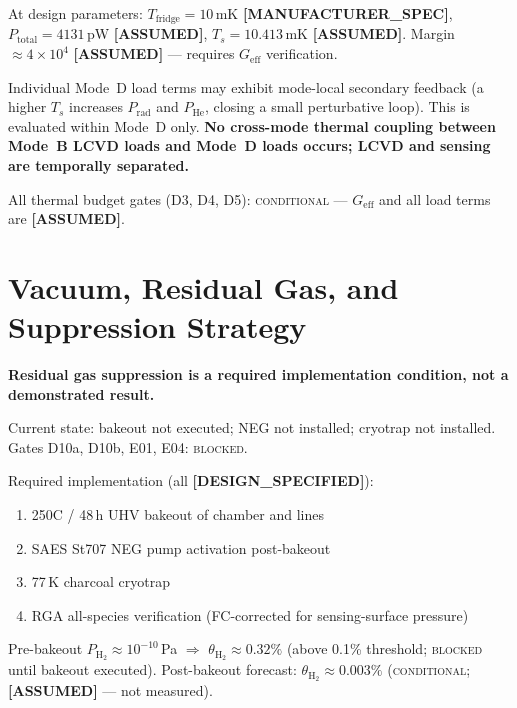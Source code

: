 \documentclass[12pt,a4paper]{article}
\newcommand{\blocked}{\textsc{blocked}}
\newcommand{\conditional}{\textsc{conditional}}
\newcommand{\assumed}{\textbf{[ASSUMED]}}
\newcommand{\designspec}{\textbf{[DESIGN\_SPECIFIED]}}
\newcommand{\mfrspec}{\textbf{[MANUFACTURER\_SPEC]}}
\begin{document}
At design parameters: $T_\mathrm{fridge} = 10$\,mK \mfrspec{},
$P_\mathrm{total} = 4131$\,pW \assumed{},
$T_s = 10.413$\,mK \assumed{}.
Margin $\approx 4\times10^4$ \assumed{} --- requires $G_\mathrm{eff}$ verification.

Individual Mode~D load terms may exhibit mode-local secondary feedback
(a higher $T_s$ increases $P_\mathrm{rad}$ and $P_\mathrm{He}$, closing a small perturbative loop).
This is evaluated within Mode~D only.
\textbf{No cross-mode thermal coupling between Mode~B LCVD loads and Mode~D loads occurs;
LCVD and sensing are temporally separated.}

All thermal budget gates (\textsc{D3}, \textsc{D4}, \textsc{D5}): \conditional{}
--- $G_\mathrm{eff}$ and all load terms are \assumed{}.

\section{Vacuum, Residual Gas, and Suppression Strategy}
\label{sec:vacuum}

\textbf{Residual gas suppression is a required implementation condition, not a demonstrated result.}

Current state: bakeout not executed; NEG not installed; cryotrap not installed.
Gates D10a, D10b, E01, E04: \blocked{}.

Required implementation (all \designspec{}):
\begin{enumerate}[noitemsep]
  \item 250\textdegree{}C / 48\,h UHV bakeout of chamber and lines~\cite{O_Hanlon2003,Jousten2016}
  \item SAES St707 NEG pump activation post-bakeout~\cite{DalPalmiero2004}
  \item 77\,K charcoal cryotrap~\cite{CERN2020}
  \item RGA all-species verification (FC-corrected for sensing-surface pressure)~\cite{Giorgi2010}
\end{enumerate}

Pre-bakeout $P_\mathrm{H_2} \approx 10^{-10}$\,Pa $\Rightarrow$
$\theta_\mathrm{H_2} \approx 0.32\%$ (above 0.1\% threshold;
\blocked{} until bakeout executed).
Post-bakeout forecast: $\theta_\mathrm{H_2} \approx 0.003\%$ (\conditional{};
\assumed{} --- not measured).

\end{document}
